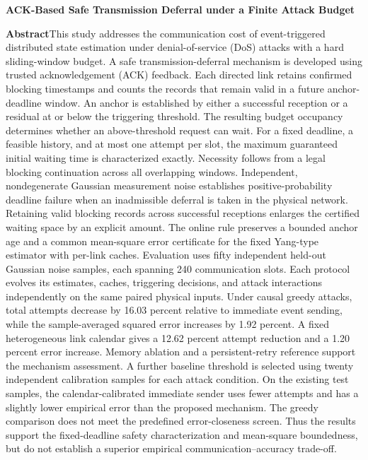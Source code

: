 \documentclass[UTF8,a4paper,zihao=5,fontset=windows]{ctexart}
\begin{document}
\begin{center}
\textbf{ACK-Based Safe Transmission Deferral under a Finite Attack Budget}
\end{center}
\noindent\textbf{Abstract}\quad This study addresses the communication cost of event-triggered distributed state estimation under denial-of-service (DoS) attacks with a hard sliding-window budget. A safe transmission-deferral mechanism is developed using trusted acknowledgement (ACK) feedback. Each directed link retains confirmed blocking timestamps and counts the records that remain valid in a future anchor-deadline window. An anchor is established by either a successful reception or a residual at or below the triggering threshold. The resulting budget occupancy determines whether an above-threshold request can wait. For a fixed deadline, a feasible history, and at most one attempt per slot, the maximum guaranteed initial waiting time is characterized exactly. Necessity follows from a legal blocking continuation across all overlapping windows. Independent, nondegenerate Gaussian measurement noise establishes positive-probability deadline failure when an inadmissible deferral is taken in the physical network. Retaining valid blocking records across successful receptions enlarges the certified waiting space by an explicit amount. The online rule preserves a bounded anchor age and a common mean-square error certificate for the fixed Yang-type estimator with per-link caches. Evaluation uses fifty independent held-out Gaussian noise samples, each spanning 240 communication slots. Each protocol evolves its estimates, caches, triggering decisions, and attack interactions independently on the same paired physical inputs. Under causal greedy attacks, total attempts decrease by 16.03 percent relative to immediate event sending, while the sample-averaged squared error increases by 1.92 percent. A fixed heterogeneous link calendar gives a 12.62 percent attempt reduction and a 1.20 percent error increase. Memory ablation and a persistent-retry reference support the mechanism assessment. A further baseline threshold is selected using twenty independent calibration samples for each attack condition. On the existing test samples, the calendar-calibrated immediate sender uses fewer attempts and has a slightly lower empirical error than the proposed mechanism. The greedy comparison does not meet the predefined error-closeness screen. Thus the results support the fixed-deadline safety characterization and mean-square boundedness, but do not establish a superior empirical communication--accuracy trade-off.
\end{document}
